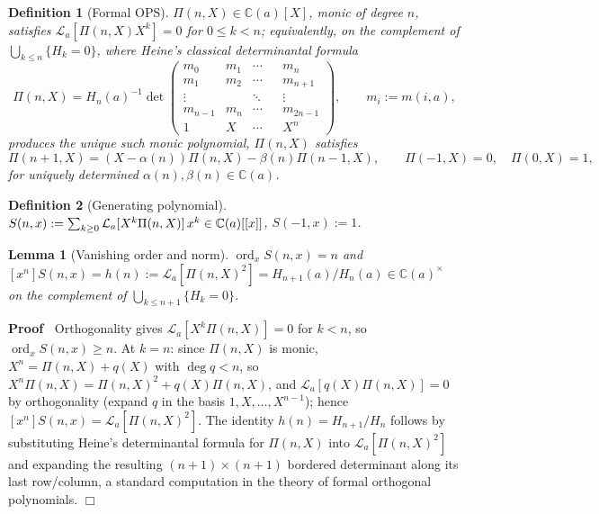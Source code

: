 \documentclass{article}
\newcommand{\assign}{:=}
\newcommand{\tmop}[1]{\ensuremath{\operatorname{#1}}}
\newenvironment{proof}{\noindent\textbf{Proof\ }}{\hspace*{\fill}$\Box$\medskip}
\newtheorem{definition}{Definition}
\newtheorem{lemma}{Lemma}
{\theorembodyfont{\rmfamily\small}\newtheorem{problem}{Problem}}
\newcommand{\ord}{\tmop{ord}}
\newcommand{\C}{\mathbb{C}}
\newcommand{\Lop}{\mathcal{L}}
\begin{document}
\begin{definition}
  [Formal OPS]\label{def:OPS} $\Pi (n, X) \in \C (a) [X]$, monic of degree
  $n$, satisfies $\Lop_a [\Pi (n, X)  X^k] = 0$ for $0 \le k < n$;
  equivalently, on the complement of $\bigcup_{k \le n} \{ H_k = 0 \}$, where
  Heine's classical determinantal formula
  \[ \Pi (n, X) = H_n (a)^{- 1}  \det \left( \begin{array}{ccccc}
       m_0 & m_1 & \cdots & & m_n\\
       m_1 & m_2 & \cdots & & m_{n + 1}\\
       \vdots & & \ddots & & \vdots\\
       m_{n - 1} & m_n & \cdots & & m_{2 n - 1}\\
       1 & X & \cdots & & X^n
     \end{array} \right), \qquad m_i \assign m (i, a), \]
  produces the unique such monic polynomial, $\Pi (n, X)$ satisfies
  \[ \Pi (n + 1, X) = (X - \alpha (n)) \Pi (n, X) - \beta (n) \Pi (n - 1, X),
     \qquad \Pi (- 1, X) = 0, \quad \Pi (0, X) = 1, \]
  for uniquely determined $\alpha (n), \beta (n) \in \C (a)$.
\end{definition}

\begin{definition}
  [Generating polynomial]\label{def:Sn} $S (n, x) \assign \sum_{k \ge 0}
  \Lop_a [X^k \Pi (n, X)]  \hspace{0.17em} x^k \in \C (a) [[x]]$, $S (- 1, x)
  \assign 1$.
\end{definition}

\begin{lemma}
  [Vanishing order and norm]\label{lem:vanord} $\ord_x S (n, x) = n$ and $[x^n]
  S (n, x) = h (n) \assign \Lop_a [\Pi (n, X)^2] = H_{n + 1} (a) / H_n (a) \in
  \C (a)^{\times}$ on the complement of $\bigcup_{k \le n + 1} \{ H_k = 0 \}$.
\end{lemma}

\begin{proof}
  Orthogonality gives $\Lop_a [X^k \Pi (n, X)] = 0$ for $k < n$, so $\ord_x S
  (n, x) \ge n$. At $k = n$: since $\Pi (n, X)$ is monic, $X^n = \Pi (n, X) +
  q (X)$ with $\deg q < n$, so $X^n \Pi (n, X) = \Pi (n, X)^2 + q (X) \Pi (n,
  X)$, and $\Lop_a [q (X) \Pi (n, X)] = 0$ by orthogonality (expand $q$ in
  the basis $1, X, \ldots, X^{n - 1}$); hence $[x^n] S (n, x) = \Lop_a [\Pi
  (n, X)^2]$. The identity $h (n) = H_{n + 1} / H_n$ follows by substituting
  Heine's determinantal formula for $\Pi (n, X)$ into $\Lop_a [\Pi (n,
  X)^2]$ and expanding the resulting $(n + 1) \times (n + 1)$ bordered
  determinant along its last row/column, a standard computation in the
  theory of formal orthogonal polynomials.
\end{proof}
\end{document}

